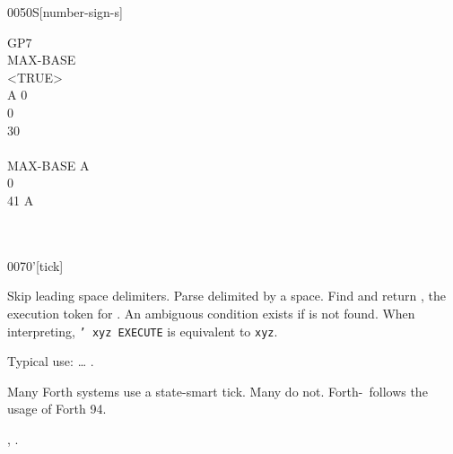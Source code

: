 \begin{worddef}[numS]{0050}{\num{}S}[number-sign-s]
\begin{testing}
		\word{:} GP7 \\
		\tab	{}  		MAX-BASE  \word{!} \\
		\tab	<TRUE> \\
		\tab	A 0  \\
		\tab[2]		 0    \\
		 \word{=}    30 \word{+} \word{=} \word{AND}  \\
		\tab	\word{LOOP} \\
		\tab	MAX-BASE A \word{DO} \\
		\tab[2]		 0   \word{num-end} \\
		 \word{=}   41  A \word{-} \word{+} \word{=}   \\
		\tab	{} \\
		\tab	{}  \word{!} \word{;} \\
	\end{testing}
\end{worddef}


\pagebreak
\begin{worddef}{0070}{'}[tick]
\item {}

	Skip leading space delimiters. Parse  delimited by
	a space. Find  and return , the execution
	token for . An ambiguous condition exists if
	 is not found. When interpreting,
	\texttt{' xyz EXECUTE} is equivalent to \texttt{xyz}.


	\begin{rationale} %
		Typical use: {\ldots}  .

		Many Forth systems use a state-smart tick. Many do not.
		Forth-\snapshot\ follows the usage of Forth 94.

	\see {},
		.
	\end{rationale}

	\begin{testing} %
		 \\
	\end{testing}
\end{worddef}


